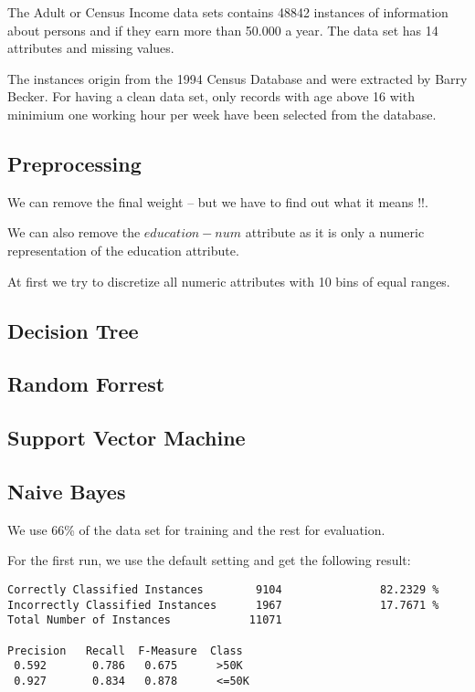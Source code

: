 \documentclass[paper=a4, fontsize=11pt]{scrartcl} %
\numberwithin{equation}{section} %
\numberwithin{figure}{section} %
\numberwithin{table}{section} %
\begin{document}
The Adult or Census Income data sets contains 48842 instances of information about persons and if they earn more than 50.000 a year. The data set has 14 attributes and missing values.

The instances origin from the 1994 Census Database and were extracted by Barry Becker. For having a clean data set, only records with age above 16 with minimium one working hour per week have been selected from the database.

\subsection{Preprocessing}

We can remove the final weight -- but we have to find out what it means !!.

We can also remove the $education-num$ attribute as it is only a numeric representation of the education attribute.

At first we try to discretize all numeric attributes with 10 bins of equal ranges.




\subsection{Decision Tree}




\subsection{Random Forrest}




\subsection{Support Vector Machine}




\subsection{Naive Bayes}

We use 66\% of the data set for training and the rest for evaluation.

For the first run, we use the default setting and get the following result:

\begin{verbatim}
Correctly Classified Instances        9104               82.2329 %
Incorrectly Classified Instances      1967               17.7671 %
Total Number of Instances            11071     

Precision   Recall  F-Measure  Class
 0.592       0.786   0.675      >50K
 0.927       0.834   0.878      <=50K
\end{verbatim}
\end{document}
